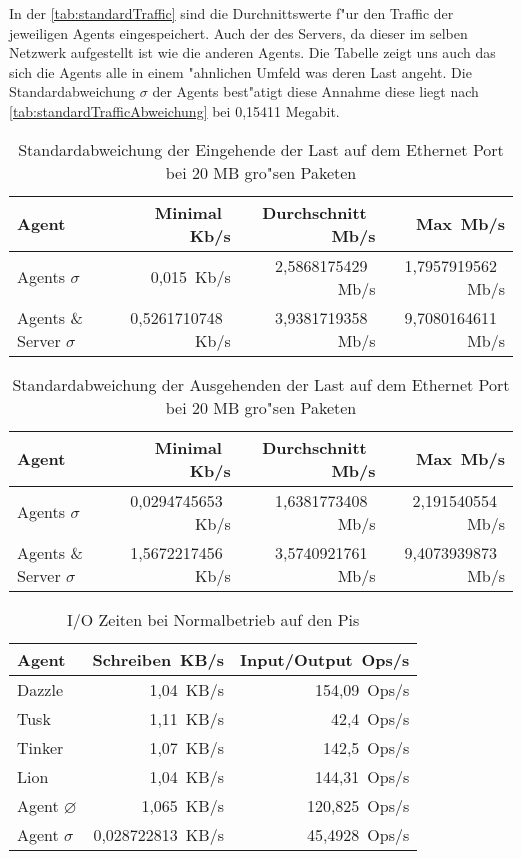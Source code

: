 In der \cref{tab:standardTraffic} sind die Durchnittswerte f"ur den Traffic der jeweiligen Agents eingespeichert. Auch der %
des Servers, da dieser im selben Netzwerk aufgestellt ist wie die anderen Agents. Die Tabelle zeigt uns auch %
das sich die Agents alle in einem "ahnlichen Umfeld was deren Last angeht. Die Standardabweichung $\sigma$ der Agents %
best"atigt diese Annahme diese liegt nach \cref{tab:standardTrafficAbweichung} bei 0,15411 Megabit.     

\begin{table}
\centering
\begin{tabular}{l%
 r<{\,Kb/s}%
 r<{\,Mb/s}%
 r<{\,Mb/s}%
}
Agent				& Minimal		& Durchschnitt          & Max		\\
\hline
Agents $\sigma $		& 0,015			& 2,5868175429		& 1,7957919562	\\
Agents \& Server $\sigma $	& 0,5261710748		& 3,9381719358        	& 9,7080164611 	\\
\end{tabular}
\caption{Standardabweichung der Eingehende der Last auf dem Ethernet Port bei 20 MB gro"sen Paketen }
\label{tab:standardTrafficAbweichungEingehend2GB}
\end{table}


\begin{table}
\centering
\begin{tabular}{l%
 r<{\,Kb/s}%
 r<{\,Mb/s}%
 r<{\,Mb/s}%
}
Agent				& Minimal		& Durchschnitt          & Max		\\
\hline
Agents $\sigma $		& 0,0294745653		& 1,6381773408		& 2,191540554	\\
Agents \& Server $\sigma $	& 1,5672217456		& 3,5740921761        	& 9,4073939873 	\\
\end{tabular}
\caption{Standardabweichung der Ausgehenden der Last auf dem Ethernet Port bei 20 MB gro"sen Paketen }
\label{tab:standardTrafficAbweichungAusgehend2GB}
\end{table}


\begin{table}
\centering
\begin{tabular}{l%
 r<{\,KB/s}%
 r<{\,Ops/s}%
}
Agent	  			& Schreiben	 	& Input/Output 	\\	
\hline
Dazzle 				& 1,04			& 154,09	        \\
Tusk 				& 1,11			& 42,4			\\
Tinker				& 1,07 			& 142,5		 	\\
Lion				& 1,04			& 144,31	 	\\
Agent $\diameter $  		& 1,065			& 120,825		\\   
Agent $\sigma $ 		& 0,028722813  		& 45,4928		\\
\end{tabular}
\caption{I/O Zeiten bei Normalbetrieb auf den Pis}
\label{tab:NormalbetriebIoStat2GB}
\end{table}


